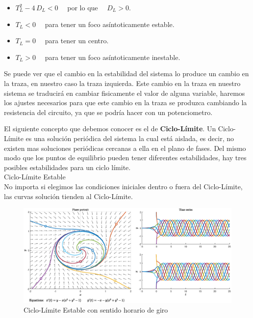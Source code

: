 \documentclass[12pt,a4paper]{report} %
\begin{document}
		\begin{itemize}
			\item $T_L^2-4\,D_L<0\quad$ por lo que $\quad D_L>0$.
			\item $T_L<0\quad$ para tener un foco asíntoticamente estable.
			\item $T_L=0\quad$ para tener un centro.
			\item $T_L>0\quad$ para tener un foco asíntoticamente inestable.
		\end{itemize}\smallskip
		
		\vspace{0.5cm}Se puede ver que el cambio en la estabilidad del sistema lo produce un cambio en la traza, en nuestro caso la traza izquierda. Este cambio en la traza en nuestro sistema se traducirá en cambiar fisicamente el valor  de alguna variable, haremos los ajustes necesarios para que este cambio en la traza se produzca cambiando la resistencia del circuito, ya que se podría hacer con un potenciometro.
		
		\vspace{0.5cm}El siguiente concepto que debemos conocer es el de \textbf{Ciclo-Límite}. Un Ciclo-Límite es una solución periódica del sistema la cual está aislada, es decir, no existen mas soluciones periódicas cercanas a ella en el plano de fases. Del mismo modo que los puntos de equilibrio pueden tener diferentes estabilidades, hay tres posibles estabilidades para un ciclo límite.\\[0.5cm]
		
		{\Large\textbullet\quad Ciclo-Límite Estable}\\[0.5cm]
		
		No importa si elegimos las condiciones iniciales dentro o fuera del Ciclo-Límite, las curvas solución tienden al Ciclo-Límite.
		
		\begin{figure}[h]
			\centering
			\includegraphics[width=1\textwidth]{cle.eps}
			\caption{Ciclo-Límite Estable con sentido horario de giro}
			\label{fig:cle}
		\end{figure}\smallskip
\end{document}
